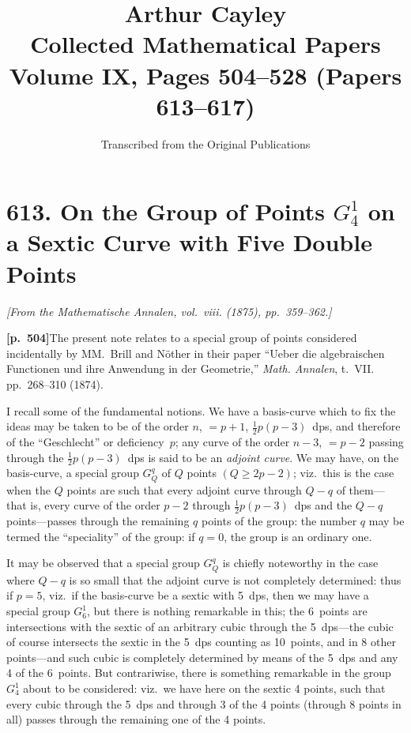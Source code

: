 \documentclass[11pt,a4paper]{article}
\title{\textbf{Arthur Cayley}\\\vspace{0.5em}
\Large Collected Mathematical Papers\\\vspace{0.3em}
\large Volume IX, Pages 504--528 (Papers 613--617)}
\author{Transcribed from the Original Publications}
\date{}
\begin{document}
\maketitle
\thispagestyle{empty}

\tableofcontents
\newpage

\section*{\textbf{613.} On the Group of Points $G_{4}^{1}$ on a Sextic Curve with Five Double Points}

\textit{[From the Mathematische Annalen, vol.~viii. (1875), pp.~359--362.]}

\bigskip

\noindent\textbf{[p.~504]}\quad The present note relates to a special group of points considered incidentally by MM.~Brill and N\"other in their paper ``Ueber die algebraischen Functionen und ihre Anwendung in der Geometrie,'' \textit{Math. Annalen}, t.~VII. pp.~268--310 (1874).

I recall some of the fundamental notions. We have a basis-curve which to fix the ideas may be taken to be of the order $n$, $= p + 1$, $\tfrac{1}{2}p(p - 3)$~dps, and therefore of the ``Geschlecht'' or deficiency~$p$; any curve of the order $n - 3$, $= p - 2$ passing through the $\tfrac{1}{2}p(p - 3)$~dps is said to be an \textit{adjoint curve}. We may have, on the basis-curve, a special group $G_{Q}^{q}$ of $Q$ points $(Q \geq 2p - 2)$; viz.\ this is the case when the $Q$ points are such that every adjoint curve through $Q - q$ of them---that is, every curve of the order $p - 2$ through $\tfrac{1}{2}p(p - 3)$~dps and the $Q - q$ points---passes through the remaining $q$ points of the group: the number $q$ may be termed the ``speciality'' of the group: if $q = 0$, the group is an ordinary one.

It may be observed that a special group $G_{Q}^{q}$ is chiefly noteworthy in the case where $Q - q$ is so small that the adjoint curve is not completely determined: thus if $p = 5$, viz.\ if the basis-curve be a sextic with 5~dps, then we may have a special group $G_{6}^{1}$, but there is nothing remarkable in this; the 6~points are intersections with the sextic of an arbitrary cubic through the 5~dps---the cubic of course intersects the sextic in the 5~dps counting as 10~points, and in 8 other points---and such cubic is completely determined by means of the 5~dps and any 4 of the 6~points. But contrariwise, there is something remarkable in the group $G_{4}^{1}$ about to be considered: viz.\ we have here on the sextic 4 points, such that every cubic through the 5~dps and through 3 of the 4 points (through 8 points in all) passes through the remaining one of the 4 points.
\end{document}
